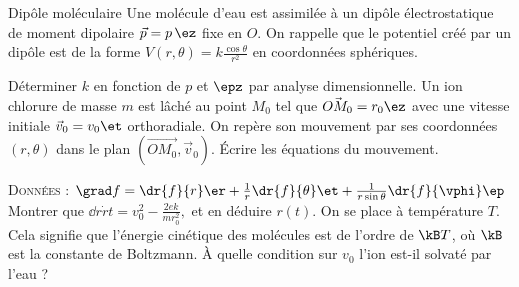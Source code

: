 \begin{exo}[PC][3]{Dipôle moléculaire}
Une molécule d’eau est assimilée à un dipôle électrostatique de moment dipolaire $\Vec{p} = p \,\ez$ fixe en $O$. On rappelle que le potentiel créé par un dipôle est de la forme $V(r,\theta) = k \frac{\cos \theta}{r^2}$ en coordonnées sphériques.

\begin{quest}
  \question Déterminer $k$ en fonction de $p$ et $\epz$ par analyse dimensionnelle.
  \question  Un ion chlorure de masse $m$ est lâché au point $M_0$ tel que $\Vec{OM_0} = r_0 \ez$  avec une vitesse initiale $\Vec{v}_0 = v_0 \et$ orthoradiale. On repère son mouvement par ses coordonnées $(r,\theta)$ dans le plan $(\Vec{OM_0},\Vec{v}_0)$. Écrire les équations du mouvement.

  \textsc{Données :} $
\grad f = \dr{f}{r} \er + \frac{1}{r}\dr{f}{\theta} \et + \frac{1}{r \sin \theta}\dr{f}{\vphi} \ep
  $
  \question Montrer que
  $
\dd{r\dot{r}}{t} =  v_0^2 - \frac{2ek}{m r_0^2},
  $
  et en déduire $r(t)$.
  \question On se place à température $T$. Cela signifie que l’énergie cinétique des molécules est de l’ordre de $\kB T$, où $\kB$ est la constante de Boltzmann. À quelle condition sur $v_0$ l’ion est-il solvaté par l’eau ?
\end{quest}
\end{exo}

